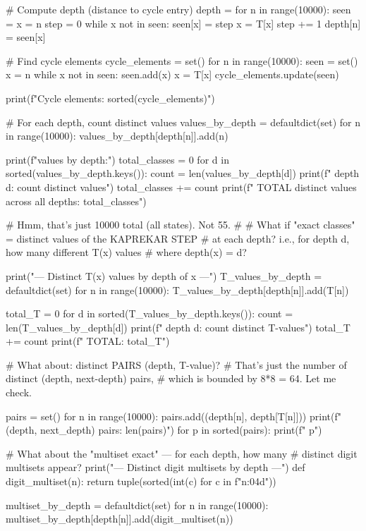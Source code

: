 {{{{{{{{{{{{{# Compute depth (distance to cycle entry)
depth = {}
for n in range(10000):
    seen = {}
    x = n
    step = 0
    while x not in seen:
        seen[x] = step
        x = T[x]
        step += 1
    depth[n] = seen[x]

# Find cycle elements
cycle_elements = set()
for n in range(10000):
    seen = set()
    x = n
    while x not in seen:
        seen.add(x)
        x = T[x]
    cycle_elements.update(seen)

print(f"Cycle elements: {sorted(cycle_elements)}")

# For each depth, count distinct values
values_by_depth = defaultdict(set)
for n in range(10000):
    values_by_depth[depth[n]].add(n)

print(f"\nDistinct values by depth:")
total_classes = 0
for d in sorted(values_by_depth.keys()):
    count = len(values_by_depth[d])
    print(f"  depth {d}: {count} distinct values")
    total_classes += count
print(f"  TOTAL distinct values across all depths: {total_classes}")

# Hmm, that's just 10000 total (all states). Not 55.
#
# What if "exact classes" = distinct values of the KAPREKAR STEP
# at each depth? i.e., for depth d, how many different T(x) values
# where depth(x) = d?

print("\n--- Distinct T(x) values by depth of x ---")
T_values_by_depth = defaultdict(set)
for n in range(10000):
    T_values_by_depth[depth[n]].add(T[n])

total_T = 0
for d in sorted(T_values_by_depth.keys()):
    count = len(T_values_by_depth[d])
    print(f"  depth {d}: {count} distinct T-values")
    total_T += count
print(f"  TOTAL: {total_T}")

# What about: distinct PAIRS (depth, T-value)?
# That's just the number of distinct (depth, next-depth) pairs,
# which is bounded by 8*8 = 64. Let me check.

pairs = set()
for n in range(10000):
    pairs.add((depth[n], depth[T[n]]))
print(f"\nDistinct (depth, next_depth) pairs: {len(pairs)}")
for p in sorted(pairs):
    print(f"  {p}")

# What about the "multiset exact" — for each depth, how many
# distinct digit multisets appear?
print("\n--- Distinct digit multisets by depth ---")
def digit_multiset(n):
    return tuple(sorted(int(c) for c in f"{n:04d}"))

multiset_by_depth = defaultdict(set)
for n in range(10000):
    multiset_by_depth[depth[n]].add(digit_multiset(n))

}}}}}}}}}}}}}
